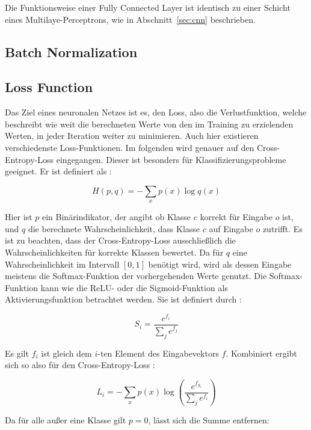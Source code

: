 Die Funktionsweise einer Fully Connected Layer ist identisch zu einer Schicht eines Multilaye-Perceptrons, wie in Abschnitt~\ref{sec:cnn} beschrieben.

\subsection{Batch Normalization}
\label{ssec:bn}

\subsection{Loss Function}
\label{ssec:loss}

Das Ziel eines neuronalen Netzes ist es, den Loss, also die Verlustfunktion, welche beschreibt wie weit die berechneten Werte von den im Training zu erzielenden Werten, in jeder Iteration weiter zu minimieren. Auch hier existieren verschiedenste Loss-Funktionen. Im folgenden wird genauer auf den Cross-Entropy-Loss eingegangen. Dieser ist besonders für Klassifizierungsprobleme geeignet. Er ist definiert als \cite{cs231n}:

\begin{equation}
H(p,q) = -\sum_x p(x)\log q(x)
\end{equation}

Hier ist $p$ ein Binärindikator, der angibt ob Klasse $c$ korrekt für Eingabe $o$ ist, und $q$ die berechnete Wahrscheinlichkeit, dass Klasse $c$ auf Eingabe $o$ zutrifft. Es ist zu beachten, dass der Cross-Entropy-Loss ausschließlich die Wahrscheinlichkeiten für korrekte Klassen bewertet. Da für $q$ eine Wahrscheinlichkeit im Intervall $[0,1]$ benötigt wird, wird als dessen Eingabe meistens die Softmax-Funktion der vorhergehenden Werte genutzt. Die Softmax-Funktion kann wie die ReLU- oder die Sigmoid-Funktion als Aktivierungsfunktion betrachtet werden. Sie ist definiert durch \cite{cs231n}:

\begin{equation}
S_i=\dfrac{e^{f_i}}{\sum_j e^{f_j}}
\end{equation}

Es gilt $f_i$ ist gleich dem $i$-ten Element des Eingabevektors $f$.
Kombiniert ergibt sich so also für den Cross-Entropy-Loss \cite{cs231n}:

\begin{equation}
L_i = -\sum_x p(x)\log\left(\dfrac{e^{f_{y_i}}}{\sum_j e^{f_i}}\right)
\end{equation}

Da für alle außer eine Klasse gilt $p=0$, lässt sich die Summe entfernen:

